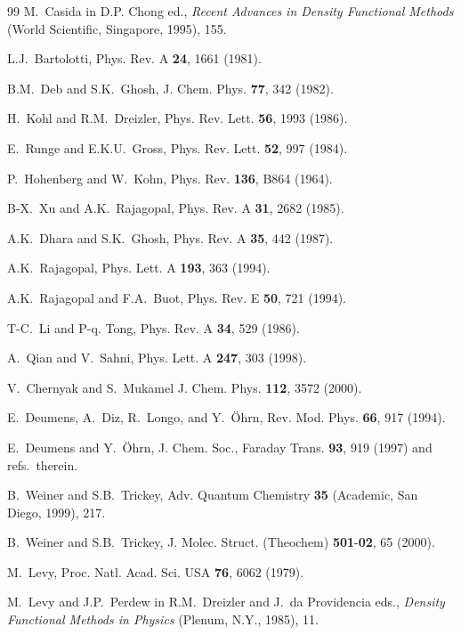 \documentclass[aps,preprint]{revtex4}%
\begin{document}
\begin{thebibliography}{99}
M.~Casida in D.P. Chong ed., \textit{Recent Advances in
Density Functional Methods} (World Scientific, Singapore, 1995), 155.

L.J.~Bartolotti, Phys. Rev. A \textbf{24}, 1661 (1981).

B.M.~Deb and S.K.~Ghosh, J. Chem. Phys. \textbf{77}, 342 (1982).

H.~Kohl and R.M.~Dreizler, Phys. Rev. Lett. \textbf{56}, 1993 (1986).

E.~Runge and E.K.U.~Gross, Phys. Rev. Lett. \textbf{52}, 997 (1984).

P.~Hohenberg and W.~Kohn, Phys. Rev. \textbf{136}, B864 (1964).

B-X.~Xu and A.K.~Rajagopal, Phys. Rev. A \textbf{31}, 2682 (1985).

A.K.~Dhara and S.K.~Ghosh, Phys. Rev. A \textbf{35}, 442 (1987).

A.K.~Rajagopal, Phys. Lett. A \textbf{193}, 363 (1994).

A.K.~Rajagopal and F.A.~Buot, Phys. Rev. E \textbf{50},
721 (1994).

T-C.~Li and P-q. Tong, Phys. Rev. A \textbf{34}, 529 (1986).

A.~Qian and V.~Sahni, Phys. Lett. A \textbf{247}, 303 (1998).

V.~Chernyak and S.~Mukamel J. Chem. Phys. \textbf{112},
3572 (2000).

E.~Deumens, A.~Diz, R.~Longo, and Y.~{\"O}hrn, Rev. Mod.
Phys. \textbf{66}, 917 (1994).

E.~Deumens and Y.~{\"O}hrn, J. Chem. Soc., Faraday Trans.
\textbf{93}, 919 (1997) and refs.~therein.

B.~Weiner and S.B.~Trickey, Adv. Quantum Chemistry
\textbf{35} (Academic, San Diego, 1999), 217.

B.~Weiner and S.B.~Trickey, J. Molec. Struct. (Theochem)
\textbf{501}-\textbf{02}, 65 (2000).

M.~Levy, Proc. Natl. Acad. Sci. USA \textbf{76}, 6062 (1979).

M.~Levy and J.P.~Perdew in R.M.~Dreizler and J.~da
Providencia eds., \textit{Density Functional Methods in Physics} (Plenum,
N.Y., 1985), 11.


\end{thebibliography}
\end{document}
